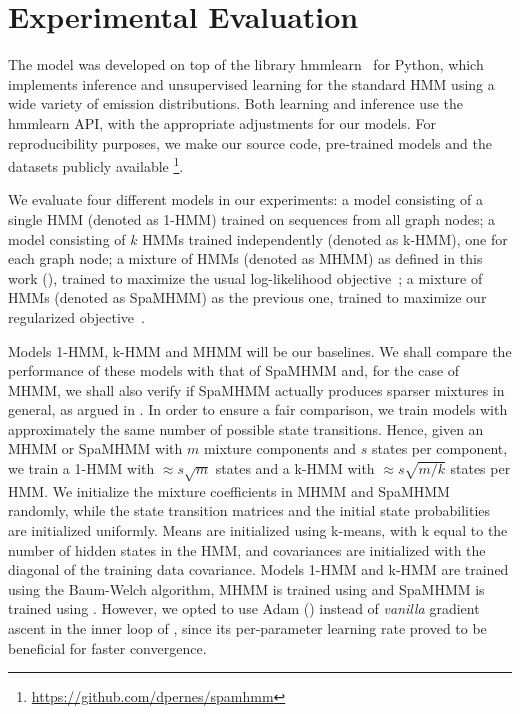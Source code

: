 \section{Experimental Evaluation}
\label{sec:experiments}
The model was developed on top of the library hmmlearn~\citet{hmmlearn} for Python, which implements inference and unsupervised learning for the standard HMM using a wide variety of emission distributions. Both learning and inference use the hmmlearn API, with the appropriate adjustments for our models. For reproducibility purposes, we make our source code, pre-trained models and the datasets publicly available \footnote{\url{https://github.com/dpernes/spamhmm}}.

We evaluate four different models in our experiments: a model consisting of a single HMM (denoted as 1-HMM) trained on sequences from all graph nodes; a model consisting of $k$ HMMs trained independently (denoted as k-HMM), one for each graph node; a mixture of HMMs (denoted as MHMM) as defined in this work (), trained to maximize the usual log-likelihood objective~; a mixture of HMMs (denoted as SpaMHMM) as the previous one, trained to maximize our regularized objective~.

Models 1-HMM, k-HMM and MHMM will be our baselines. We shall compare the performance of these models with that of SpaMHMM and, for the case of MHMM, we shall also verify if SpaMHMM actually produces sparser mixtures in general, as argued in . In order to ensure a fair comparison, we train models with approximately the same number of possible state transitions. Hence, given an MHMM or SpaMHMM with $m$ mixture components and $s$ states per component, we train a 1-HMM with $\approx s\sqrt{m}$ states and a k-HMM with $\approx s\sqrt{m/k}$ states per HMM. We initialize the mixture coefficients in MHMM and SpaMHMM randomly, while the state transition matrices and the initial state probabilities are initialized uniformly. Means are initialized using k-means, with k equal to the number of hidden states in the HMM, and covariances are initialized with the diagonal of the training data covariance. Models 1-HMM and k-HMM are trained using the Baum-Welch algorithm, MHMM is trained using  and SpaMHMM is trained using . However, we opted to use Adam (\citet{Kingma2014}) instead of \textit{vanilla} gradient ascent in the inner loop of , since its per-parameter learning rate proved to be beneficial for faster convergence.

